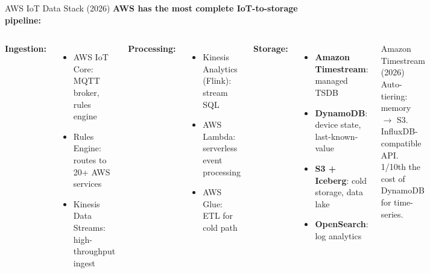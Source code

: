 \documentclass[aspectratio=169,11pt]{beamer}
\begin{document}
\begin{frame}{AWS IoT Data Stack (2026)}
    \small
    \textbf{AWS has the most complete IoT-to-storage pipeline:}

    \vspace{0.05cm}
    \begin{columns}
        \textbf{Ingestion:}
        \begin{itemize}\setlength{\itemsep}{0pt}
            \item AWS IoT Core: MQTT broker, rules engine
            \item Rules Engine: routes to 20+ AWS services
            \item Kinesis Data Streams: high-throughput ingest
        \end{itemize}

        \vspace{0.05cm}
        \textbf{Processing:}
        \begin{itemize}\setlength{\itemsep}{0pt}
            \item Kinesis Analytics (Flink): stream SQL
            \item AWS Lambda: serverless event processing
            \item AWS Glue: ETL for cold path
        \end{itemize}

        \textbf{Storage:}
        \begin{itemize}\setlength{\itemsep}{0pt}
            \item \textbf{Amazon Timestream}: managed TSDB
            \item \textbf{DynamoDB}: device state, last-known-value
            \item \textbf{S3 + Iceberg}: cold storage, data lake
            \item \textbf{OpenSearch}: log analytics
        \end{itemize}

        \vspace{0.05cm}
        \begin{alertblock}{Amazon Timestream (2026)}
            Auto-tiering: memory $\rightarrow$ S3. InfluxDB-compatible API. 1/10th the cost of DynamoDB for time-series.
        \end{alertblock}
    \end{columns}
\end{frame}

\end{document}
